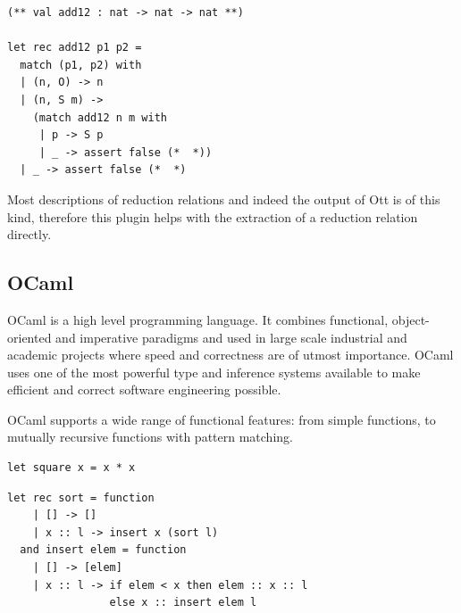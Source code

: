 \documentclass[12pt,twoside,notitlepage]{report}
\theoremstyle{plain}%
\theoremstyle{definition}
\theoremstyle{remark}
\begin{document}
\begin{minipage}{\linewidth}

\begin{lstlisting}[language={Coq},caption={Coq to OCaml extraction of a logical inductive relation}, label={lst:coqlogindextractex}]
(** val add12 : nat -> nat -> nat **)

let rec add12 p1 p2 =
  match (p1, p2) with
  | (n, O) -> n
  | (n, S m) ->
    (match add12 n m with
     | p -> S p
     | _ -> assert false (*  *))
  | _ -> assert false (*  *)
\end{lstlisting}

\end{minipage}

Most descriptions of reduction relations and indeed the output of Ott is of this kind, therefore this plugin helps with the extraction of a reduction relation directly. 

\subsection{OCaml}
OCaml is a high level programming language. It combines functional, object-oriented and imperative paradigms and used in large scale industrial and academic projects where speed and correctness are of utmost importance. OCaml uses one of the most powerful type and inference systems available to make efficient and correct software engineering possible.

OCaml supports a wide range of functional features: from simple functions, to mutually recursive functions with pattern matching.
\vspace{3mm}

\begin{minipage}{\linewidth}
\begin{lstlisting}[caption={OCaml simple function example: square}]
let square x = x * x
\end{lstlisting}

\end{minipage}

\begin{minipage}{\linewidth}

\begin{lstlisting}[caption={OCaml complex function example: insertion sort}]
let rec sort = function
    | [] -> []
    | x :: l -> insert x (sort l)
  and insert elem = function
    | [] -> [elem]
    | x :: l -> if elem < x then elem :: x :: l
                else x :: insert elem l
\end{lstlisting}

\end{minipage}
\end{document}
